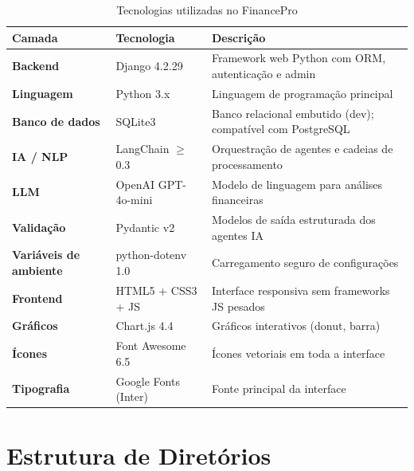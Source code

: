 \documentclass[12pt, a4paper, oneside]{report}
\begin{document}
\begin{table}[H]
\centering
\caption{Tecnologias utilizadas no FinancePro}
\begin{tabularx}{\textwidth}{>{\bfseries}l l X}
\toprule
Camada & Tecnologia & Descrição \\
\midrule
Backend & Django 4.2.29 & Framework web Python com ORM, autenticação e admin \\
Linguagem & Python 3.x & Linguagem de programação principal \\
Banco de dados & SQLite3 & Banco relacional embutido (dev); compatível com PostgreSQL \\
IA / NLP & LangChain $\geq$ 0.3 & Orquestração de agentes e cadeias de processamento \\
LLM & OpenAI GPT-4o-mini & Modelo de linguagem para análises financeiras \\
Validação & Pydantic v2 & Modelos de saída estruturada dos agentes IA \\
Variáveis de ambiente & python-dotenv 1.0 & Carregamento seguro de configurações \\
Frontend & HTML5 + CSS3 + JS & Interface responsiva sem frameworks JS pesados \\
Gráficos & Chart.js 4.4 & Gráficos interativos (donut, barra) \\
Ícones & Font Awesome 6.5 & Ícones vetoriais em toda a interface \\
Tipografia & Google Fonts (Inter) & Fonte principal da interface \\
\bottomrule
\end{tabularx}
\end{table}

\section{Estrutura de Diretórios}
\end{document}
